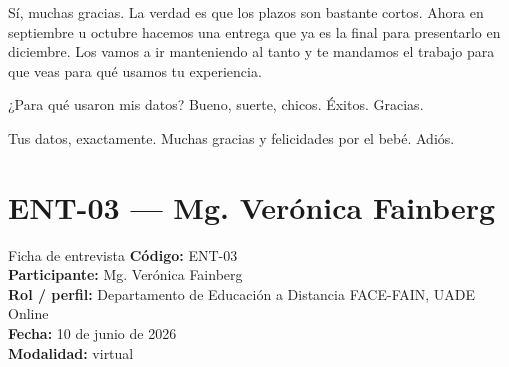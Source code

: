 \begin{description}[leftmargin=0cm, labelsep=0.5cm, style=nextline]
\item[\textbf{Entrevistadores:}] Sí, muchas gracias. La verdad es que los plazos son bastante cortos. Ahora en septiembre u octubre hacemos una entrega que ya es la final para presentarlo en diciembre. Los vamos a ir manteniendo al tanto y te mandamos el trabajo para que veas para qué usamos tu experiencia.
\item[\textbf{Entrevistado:}] ¿Para qué usaron mis datos? Bueno, suerte, chicos. Éxitos. Gracias.
\item[\textbf{Entrevistadores:}] Tus datos, exactamente. Muchas gracias y felicidades por el bebé. Adiós.
\end{description}

\section*{ENT-03 --- Mg. Verónica Fainberg}
\begin{ficha}{Ficha de entrevista}
\small
\textbf{Código:} ENT-03\\[2pt]
\textbf{Participante:} Mg. Verónica Fainberg\\[2pt]
\textbf{Rol / perfil:} Departamento de Educación a Distancia FACE-FAIN, UADE Online\\[2pt]
\textbf{Fecha:} 10 de junio de 2026\\[2pt]
\textbf{Modalidad:} virtual\\[2pt]
\end{ficha}
